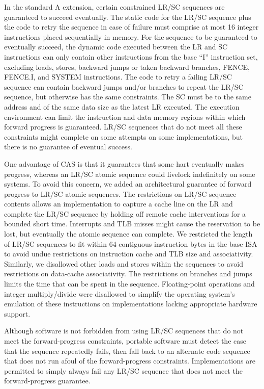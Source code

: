 \label{lrscseq}

In the standard A extension, certain constrained LR/SC sequences are
guaranteed to succeed eventually.  The static code for the LR/SC
sequence plus the code to retry the sequence in case of failure must
comprise at most 16 integer instructions placed sequentially in
memory.  For the sequence to be guaranteed to eventually succeed, the
dynamic code executed between the LR and SC instructions can only
contain other instructions from the base ``I'' instruction set, excluding
loads, stores, backward jumps or taken backward branches, FENCE,
FENCE.I, and SYSTEM instructions.  The code to retry a failing LR/SC
sequence can contain backward jumps and/or branches to repeat the
LR/SC sequence, but otherwise has the same constraints.  The SC must
be to the same address and of the same data size as the latest LR
executed.  The execution environment can limit the instruction and
data memory regions within which forward progress is guaranteed.
LR/SC sequences that do not meet all these constraints might complete on
some attempts on some implementations, but there is no guarantee of
eventual success.

\begin{commentary}
One advantage of CAS is that it guarantees that some hart eventually
makes progress, whereas an LR/SC atomic sequence could livelock
indefinitely on some systems.  To avoid this concern, we added an
architectural guarantee of forward progress to LR/SC atomic sequences.
The restrictions on LR/SC sequence contents allows an implementation
to capture a cache line on the LR and complete the LR/SC sequence by
holding off remote cache interventions for a bounded short
time. Interrupts and TLB misses might cause the reservation to be
lost, but eventually the atomic sequence can complete.  We restricted
the length of LR/SC sequences to fit within 64 contiguous instruction
bytes in the base ISA to avoid undue restrictions on instruction cache
and TLB size and associativity.  Similarly, we disallowed other loads
and stores within the sequences to avoid restrictions on data-cache
associativity.  The restrictions on branches and jumps limits the time
that can be spent in the sequence.  Floating-point operations and
integer multiply/divide were disallowed to simplify the operating
system's emulation of these instructions on implementations lacking
appropriate hardware support.

Although software is not forbidden from using LR/SC sequences that do not meet
the forward-progress constraints, portable software must detect the case that
the sequence repeatedly fails, then fall back to an alternate code sequence
that does not run afoul of the forward-progress constraints.
Implementations are permitted to simply always fail any LR/SC sequence that does
not meet the forward-progress guarantee.
\end{commentary}

